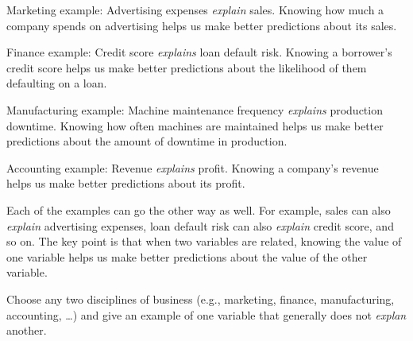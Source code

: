 \documentclass[
  12pt,
  letterpaper,
  DIV=11,
  numbers=noendperiod]{scrreprt}
\begin{document}
\begin{tcolorbox}[enhanced jigsaw, colback=white, leftrule=.75mm, toprule=.15mm, bottomtitle=1mm, breakable, coltitle=black, toptitle=1mm, title={Suggested answer}, opacitybacktitle=0.6, colbacktitle=quarto-callout-note-color!10!white, arc=.35mm, left=2mm, colframe=quarto-callout-note-color-frame, titlerule=0mm, rightrule=.15mm, bottomrule=.15mm, opacityback=0]

Marketing example: Advertising expenses \emph{explain} sales. Knowing
how much a company spends on advertising helps us make better
predictions about its sales.

Finance example: Credit score \emph{explains} loan default risk. Knowing
a borrower's credit score helps us make better predictions about the
likelihood of them defaulting on a loan.

Manufacturing example: Machine maintenance frequency \emph{explains}
production downtime. Knowing how often machines are maintained helps us
make better predictions about the amount of downtime in production.

Accounting example: Revenue \emph{explains} profit. Knowing a company's
revenue helps us make better predictions about its profit.

Each of the examples can go the other way as well. For example, sales
can also \emph{explain} advertising expenses, loan default risk can also
\emph{explain} credit score, and so on. The key point is that when two
variables are related, knowing the value of one variable helps us make
better predictions about the value of the other variable.

\end{tcolorbox}

\begin{tcolorbox}[enhanced jigsaw, colback=white, leftrule=.75mm, toprule=.15mm, bottomtitle=1mm, breakable, coltitle=black, toptitle=1mm, title={Quick Check}, opacitybacktitle=0.6, colbacktitle=quarto-callout-note-color!10!white, arc=.35mm, left=2mm, colframe=quarto-callout-note-color-frame, titlerule=0mm, rightrule=.15mm, bottomrule=.15mm, opacityback=0]

Choose any two disciplines of business (e.g., marketing, finance,
manufacturing, accounting, \ldots) and give an example of one variable
that generally does not \emph{explan} another.

\end{tcolorbox}
\end{document}
